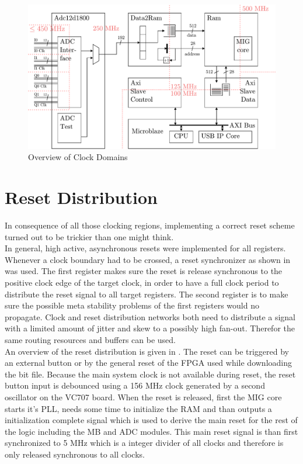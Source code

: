 \begin{figure}
  \centering
  \includegraphics[width=\textwidth]{figures/fpga_clock_domains_overview}
  \caption{Overview of Clock Domains}
  \label{fig:fpga_clock_domains}
\end{figure}

\section{Reset Distribution}
\label{sec:fpga_reset}

In consequence of all those clocking regions, implementing a correct
reset scheme turned out to be trickier than one might think. \\

In general, high active, asynchronous resets were implemented for all
registers. Whenever a clock boundary had to be crossed, a reset synchronizer
as shown in  was used. The first register
makes sure the reset is release synchronous to the positive clock edge
of the target clock, in order to have a full clock period to distribute
the reset signal to all target registers. The second register is
to make sure the possible meta stability problems of the first registers would
no propagate. Clock and reset distribution networks both need to
distribute a signal with a limited amount of jitter and skew to a possibly
high fan-out. Therefor the same routing resources and buffers can be used.  \\

An overview of the reset distribution is given in
. The reset can be triggered
by an external button or by the general reset of the \gls{FPGA}
used while downloading the bit file. Because the main system clock is
not available during reset, the reset button input is debounced using a
156 MHz clock generated by a second oscillator on the VC707 board.
When the reset is released, first the \gls{MIG} core starts
it's \gls{PLL}, needs some time to initialize the \gls{RAM} and than
outputs a initialization complete signal which is used to derive the main reset
for the rest of the logic including the \gls{MB} and \gls{ADC} modules.
This main reset signal is than first synchronized to 5 MHz which is a
integer divider of all clocks and therefore is only released synchronous
to all clocks. \\

